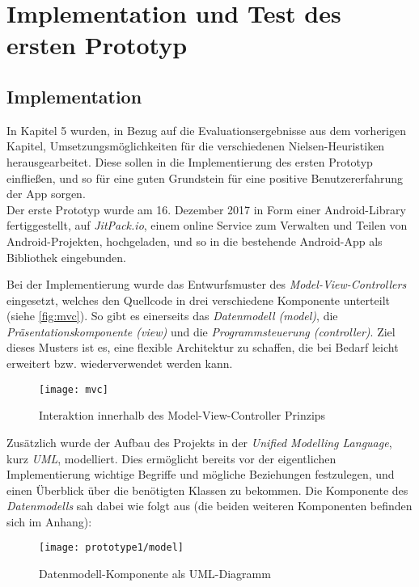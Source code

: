\section{Implementation und Test des ersten Prototyp}\label{sec:pro1}

\subsection{Implementation}
In Kapitel 5 wurden, in Bezug auf die Evaluationsergebnisse aus dem vorherigen Kapitel, Umsetzungsmöglichkeiten für die verschiedenen Nielsen-Heuristiken herausgearbeitet.
Diese sollen in die Implementierung des ersten Prototyp einfließen, und so für eine guten Grundstein für eine positive Benutzererfahrung der App sorgen. \\

Der erste Prototyp wurde am 16. Dezember 2017 in Form einer Android-Library fertiggestellt, auf \emph{JitPack.io}, einem online Service zum Verwalten und Teilen von Android-Projekten, hochgeladen, und so in die bestehende Android-App als Bibliothek eingebunden. \\

Bei der Implementierung wurde das Entwurfsmuster des \emph{Model-View-Controllers} eingesetzt, welches den Quellcode in drei verschiedene Komponente unterteilt (siehe \autoref{fig:mvc}).
So gibt es einerseits das \emph{Datenmodell (model)}, die \emph{Präsentationskomponente (view)} und die \emph{Programmsteuerung (controller)}.
Ziel dieses Musters ist es, eine flexible Architektur zu schaffen, die bei Bedarf leicht erweitert bzw. wiederverwendet werden kann.

\begin{figure}[h]
  \centering
  \texttt{[image: mvc]}
  \caption{Interaktion innerhalb des Model-View-Controller Prinzips}
  \label{fig:mvc}
\end{figure}

\noindent
Zusätzlich wurde der Aufbau des Projekts in der \emph{Unified Modelling Language}, kurz \emph{UML}, modelliert.
Dies ermöglicht bereits vor der eigentlichen Implementierung wichtige Begriffe und mögliche Beziehungen festzulegen, und einen Überblick über die benötigten Klassen zu bekommen.
Die Komponente des \emph{Datenmodells} sah dabei wie folgt aus (die beiden weiteren Komponenten befinden sich im Anhang):

\begin{figure}[h]
  \centering
  \texttt{[image: prototype1/model]}
  \caption{Datenmodell-Komponente als UML-Diagramm}
  \label{fig:model1}
\end{figure}

